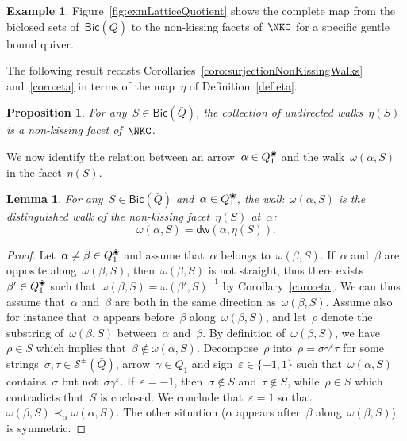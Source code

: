 \documentclass{amsart}
\newtheorem{proposition}[theorem]{Proposition}
\newtheorem{lemma}[theorem]{Lemma}
\theoremstyle{definition}
\newtheorem{example}[theorem]{Example}
\newcommand{\fref}[1]{Figure~\ref{#1}} %
\newcommand{\blossom}{^\text{\ding{96}}} %
\newcommand{\strings}{\mathcal{S}} %
\newcommand{\distinguishedWalk}[2]{\mathsf{dw}(#1,#2)} %
\newcommand{\Bicl}[1]{\mathsf{Bic}(#1)} %
\begin{document}
\begin{example}
\fref{fig:exmLatticeQuotient} shows the complete map from the biclosed sets of~$\Bicl{\bar Q}$ to the non-kissing facets of~$\NKC$ for a specific gentle bound quiver.
\end{example}

The following result recasts Corollaries~\ref{coro:surjectionNonKissingWalks} and~\ref{coro:eta} in terms of the map~$\eta$ of Definition~\ref{def:eta}.

\begin{proposition}
For any~$S \in \Bicl{\bar Q}$, the collection of undirected walks~$\eta(S)$ is a non-kissing facet of~$\NKC$.
\end{proposition}

We now identify the relation between an arrow~$\alpha \in Q_1\blossom$ and the walk~$\omega(\alpha,S)$ in the facet~$\eta(S)$.

\begin{lemma}
\label{lem:distinguishedWalkEta}
For any~$S \in \Bicl{\bar Q}$ and~$\alpha \in Q_1\blossom$, the walk~$\omega(\alpha,S)$ is the distinguished walk of the non-kissing facet~$\eta(S)$ at~$\alpha$:
\[
\omega(\alpha,S) = \distinguishedWalk{\alpha}{\eta(S)}.
\]
\end{lemma}

\begin{proof}
Let~$\alpha \ne \beta \in Q_1\blossom$ and assume that~$\alpha$ belongs to~$\omega(\beta,S)$.
If~$\alpha$ and~$\beta$ are opposite along~$\omega(\beta,S)$, then~$\omega(\beta,S)$ is not straight, thus there exists~$\beta' \in Q_1\blossom$ such that~${\omega(\beta,S) = \omega(\beta',S)^{-1}}$ by Corollary~\ref{coro:eta}.
We can thus assume that~$\alpha$ and~$\beta$ are both in the same direction as~$\omega(\beta,S)$.
Assume also for instance that~$\alpha$ appears before~$\beta$ along~$\omega(\beta,S)$, and let~$\rho$ denote the substring of~$\omega(\beta,S)$ between~$\alpha$ and~$\beta$.
By definition of~$\omega(\beta,S)$, we have~$\rho \in S$ which implies that~$\beta \notin \omega(\alpha,S)$.
Decompose~$\rho$ into~$\rho = \sigma \gamma^\varepsilon \tau$ for some strings~$\sigma, \tau \in \strings^\pm(\bar Q)$, arrow~$\gamma \in Q_1$ and sign~$\varepsilon \in \{-1,1\}$ such that~$\omega(\alpha,S)$ contains~$\sigma$ but not~$\sigma \gamma^\varepsilon$.
If~$\varepsilon = -1$, then~$\sigma \notin S$ and~$\tau \notin S$, while~$\rho \in S$ which contradicts that~$S$ is coclosed.
We conclude that~$\varepsilon = 1$ so that~$\omega(\beta,S) \prec_\alpha \omega(\alpha,S)$.
The other situation ($\alpha$ appears after~$\beta$ along~$\omega(\beta,S)$) is symmetric.
\end{proof}
\end{document}
